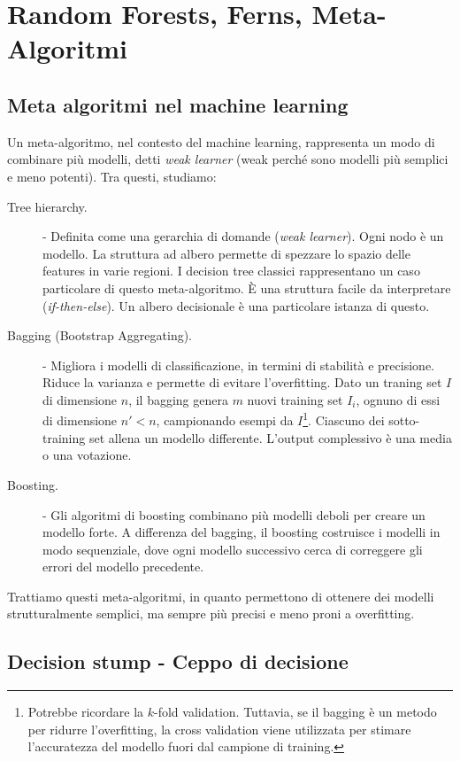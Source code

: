 \chapter{Random Forests, Ferns, Meta-Algoritmi}\label{chap:random_forest}

\section{Meta algoritmi nel machine learning}
Un meta-algoritmo, nel contesto del machine learning, rappresenta un modo di combinare più modelli, detti \textit{weak learner} (weak perché sono modelli più semplici e meno potenti). Tra questi, studiamo:
\begin{description}
	\item[Tree hierarchy.] - Definita come una gerarchia di domande (\textit{weak learner}). Ogni nodo è un modello. La struttura ad albero permette di spezzare lo spazio delle features in varie regioni. I decision tree classici rappresentano un caso particolare di questo meta-algoritmo. È una struttura facile da interpretare (\textit{if-then-else}). Un albero decisionale è una particolare istanza di questo.
	\item[Bagging (Bootstrap Aggregating).] -  Migliora i modelli di classificazione, in termini di stabilità e precisione. Riduce la varianza e permette di evitare l'overfitting.
	Dato un traning set $I$ di dimensione $n$, il bagging genera $m$ nuovi training set $I_i$, ognuno di essi di dimensione $n' < n$, campionando esempi da $I$\footnote{Potrebbe ricordare la $k$-fold validation. Tuttavia, se il bagging  è un metodo per ridurre l'overfitting, la cross validation viene utilizzata per stimare l'accuratezza del modello fuori dal campione di training.}. Ciascuno dei sotto-training set allena un modello differente. L'output complessivo è una media o una votazione.
	\item[Boosting.] - Gli algoritmi di boosting combinano più modelli deboli per creare un modello forte. A differenza del bagging, il boosting costruisce i modelli in modo sequenziale, dove ogni modello successivo cerca di correggere gli errori del modello precedente.
\end{description}

\bigskip

Trattiamo questi meta-algoritmi, in quanto permettono di ottenere dei modelli strutturalmente semplici, ma sempre più precisi e meno proni a overfitting.

\section{Decision stump - Ceppo di decisione}

